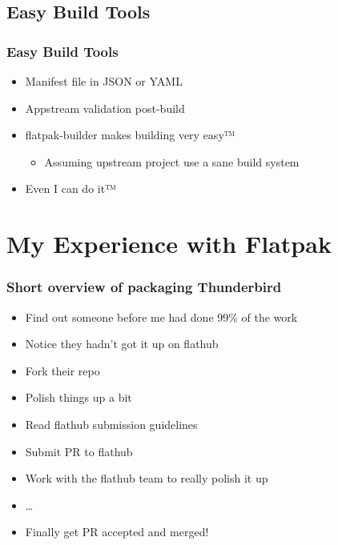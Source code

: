 \documentclass[handout]{beamer}
\begin{document}
\subsection{Easy Build Tools}
\begin{frame}
	\frametitle{Easy Build Tools}
	\begin{itemize}
		\item{Manifest file in JSON or YAML}
		\item{Appstream validation post-build}
		\item{flatpak-builder makes building very easy™}
			\begin{itemize}
				\item{Assuming upstream project use a sane build system}
			\end{itemize}
		\item{Even I can do it™}
	\end{itemize}
\end{frame}
\section{My Experience with Flatpak}
\begin{frame}
	\frametitle{Short overview of packaging Thunderbird}
	\begin{itemize}
		\item{Find out someone before me had done 99\% of the work}
		\item{Notice they hadn't got it up on flathub}
		\item{Fork their repo}
		\item{Polish things up a bit}
		\item{Read flathub submission guidelines}
		\item{Submit PR to flathub}
		\item{Work with the flathub team to really polish it up}
		\item{\ldots}
		\item{Finally get PR accepted and merged!}
	\end{itemize}
\end{frame}
\end{document}
